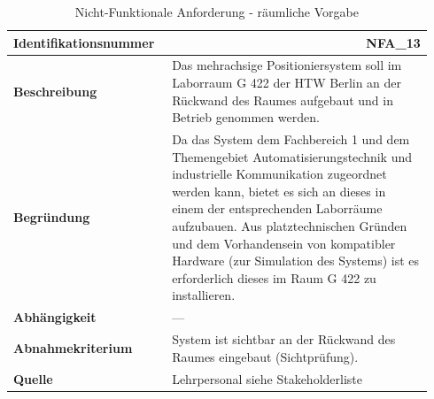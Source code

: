 \documentclass[../../../Bachelorarbeit.tex]{subfiles}
\begin{document}
\begin{table}[H]
    \centering
    \begin{tabular}{ p{0.34\linewidth}  p{0.6\linewidth} }
        \hline
        \textbf{Identifikationsnummer}  & \multicolumn{1}{r}{NFA\_13} \\ \hline
        \textbf{Beschreibung}           & Das mehrachsige Positioniersystem soll im Laborraum G 422 der HTW Berlin an der Rückwand des Raumes aufgebaut und in Betrieb genommen werden. \\
        \textbf{Begründung}             & Da das System dem Fachbereich 1 und dem Themengebiet Automatisierungstechnik und industrielle Kommunikation zugeordnet werden kann, bietet es sich an dieses in einem der entsprechenden Laborräume aufzubauen. Aus platztechnischen Gründen und dem Vorhandensein von kompatibler Hardware (zur Simulation des Systems) ist es erforderlich dieses im Raum G 422 zu installieren. \\
        \textbf{Abhängigkeit}           & --- \\
        \textbf{Abnahmekriterium}       & System ist sichtbar an der Rückwand des Raumes eingebaut (Sichtprüfung). \\
        \textbf{Quelle}                 & Lehrpersonal siehe Stakeholderliste \\ \hline
    \end{tabular}
    \caption[\acs{nfa} - räumliche Vorgabe]{Nicht-Funktionale Anforderung - räumliche Vorgabe}
    \label{tab:my-table19}
\end{table}
\end{document}
